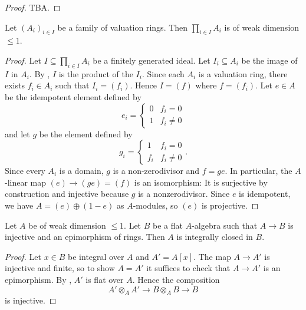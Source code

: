 \begin{proof}
    TBA.
\end{proof}

\begin{lemma}[\stacksproject{092T}]
    Let $(A_i)_{i \in I}$ be a family of valuation rings. Then
    $\prod_{i \in I} A_i$ is of weak dimension $\le 1$.
    \label{lemma:prod-valuation-ring-weak-dim-integrally-closed}
    \leanok
\end{lemma}

\begin{proof}
    Let $I \subseteq \prod_{i \in I} A_i$ be a finitely generated ideal. Let $I_i \subseteq A_i$
    be the image of $I$ in $A_i$.
    By , $I$ is the product of the $I_i$.
    Since each $A_i$ is a valuation ring, there exists $f_i \in A_i$ such
    that $I_i = (f_i)$. Hence $I = (f)$ where $f = (f_i)$. Let $e \in A$
    be the idempotent element defined by
    \[
    e_i = \begin{cases}
        0 & f_i = 0 \\
        1 & f_i \neq 0
    \end{cases}
    \] and let $g$ be the element defined by
    \[
    g_i = \begin{cases}
        1 & f_i = 0 \\
        f_i & f_i \neq 0
    \end{cases}
    .\] Since every $A_i$ is a domain, $g$ is a non-zerodivisor and $f = g e$. In particular,
    the $A$-linear map $(e) \to (ge) = (f)$ is an isomorphism: It is surjective by construction
    and injective because $g$ is a nonzerodivisor. Since $e$ is idempotent,
    we have $A = (e) \oplus (1 - e)$ as $A$-modules, so $(e)$ is projective.
\end{proof}

\begin{lemma}[\stacksproject{092V}]
    Let $A$ be of weak dimension $\le 1$. Let $B$ be a
    flat $A$-algebra such that $A \to B$ is injective and an epimorphism of rings. Then
    $A$ is integrally closed in $B$.
    \label{lemma:weak-dim-integrally-closed}
    \leanok
\end{lemma}

\begin{proof}
    Let $x \in B$ be integral over $A$ and $A' = A[x]$. The map $A \to A'$ is injective and finite, so
    to show $A = A'$ it suffices to check that $A \to A'$ is an epimorphism. By
    , $A'$ is flat over $A$. Hence
    the composition
    \[
        A' \otimes_{A} A' \to B \otimes_{A} B \to B
    \] is injective.
\end{proof}

